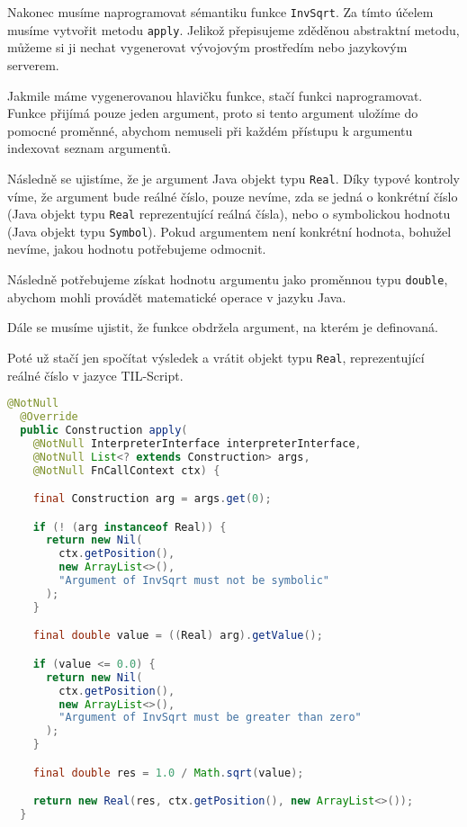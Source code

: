 Nakonec musíme naprogramovat sémantiku funkce \lstinline{InvSqrt}. Za tímto účelem musíme vytvořit
metodu \lstinline{apply}. Jelikož přepisujeme zděděnou abstraktní metodu, můžeme si ji nechat
vygenerovat vývojovým prostředím nebo jazykovým serverem.

Jakmile máme vygenerovanou hlavičku funkce, stačí funkci naprogramovat. Funkce přijímá pouze jeden
argument, proto si tento argument uložíme do pomocné proměnné, abychom nemuseli při každém
přístupu k argumentu indexovat seznam argumentů.

Následně se ujistíme, že je argument Java objekt typu \lstinline{Real}. Díky typové kontroly víme,
že argument bude reálné číslo, pouze nevíme, zda se jedná o konkrétní číslo (Java objekt typu
\lstinline{Real} reprezentující reálná čísla), nebo o symbolickou hodnotu (Java objekt typu
\lstinline{Symbol}). Pokud argumentem není konkrétní hodnota, bohužel nevíme, jakou hodnotu
potřebujeme odmocnit.

Následně potřebujeme získat hodnotu argumentu jako proměnnou typu \lstinline{double}, abychom
mohli provádět matematické operace v jazyku Java.

Dále se musíme ujistit, že funkce obdržela argument, na kterém je definovaná.

Poté už stačí jen spočítat výsledek a vrátit objekt typu \lstinline{Real}, reprezentující reálné
číslo v jazyce TIL-Script.

\begin{lstlisting}[caption={Konstruktor InvSqrt}, language=Java]
  @NotNull
  @Override
  public Construction apply(
    @NotNull InterpreterInterface interpreterInterface,
    @NotNull List<? extends Construction> args,
    @NotNull FnCallContext ctx) {

    final Construction arg = args.get(0);

    if (! (arg instanceof Real)) {
      return new Nil(
        ctx.getPosition(),
        new ArrayList<>(),
        "Argument of InvSqrt must not be symbolic"
      );
    }

    final double value = ((Real) arg).getValue();

    if (value <= 0.0) {
      return new Nil(
        ctx.getPosition(),
        new ArrayList<>(),
        "Argument of InvSqrt must be greater than zero"
      );
    }

    final double res = 1.0 / Math.sqrt(value);

    return new Real(res, ctx.getPosition(), new ArrayList<>());
  }
\end{lstlisting}

